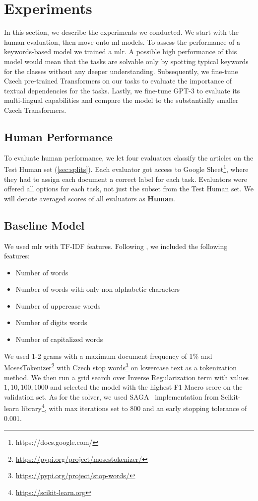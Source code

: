 \chapter{Experiments}
\label{chap:experiments}
In this section, we describe the experiments we conducted.
We start with the human evaluation, then move onto \ac{ml} models.
To assess the performance of a keywords-based model we trained 
a \ac{mlr}.  A possible high performance of
this model would mean that the tasks are solvable only by spotting typical keywords
for the classes without any deeper understanding. Subsequently,
we fine-tune Czech pre-trained Transformers on our tasks to evaluate
the importance of textual dependencies for the tasks. Lastly, we fine-tune
GPT-3 to evaluate its multi-lingual capabilities and compare the model to the
substantially smaller Czech Transformers.

\section{Human Performance}
\label{sec:human}
To evaluate human performance, we let four evaluators classify the articles on 
the Test Human set (\autoref{sec:splits}).
Each evaluator got access to Google Sheet\footnote{https://docs.google.com/},
where they had to assign each document a correct label for each task.
Evaluators were offered all options for each task, not just the subset from the Test Human set.
We will denote averaged scores of all evaluators as \textbf{Human}.

\section{Baseline Model}
\label{sec:baseline-exp}
We used \ac{mlr} with TF-IDF features.
Following \textcite{strakaSumeCzechLargeCzech2018a}, we included the following features:
\begin{itemize}
    \item Number of words
    \item Number of words with only non-alphabetic characters
    \item Number of uppercase words
    \item Number of digits words
    \item Number of capitalized words
\end{itemize}
We  used 1-2 grams with a maximum document frequency of 1\% and MosesTokenizer\footnote{\url{https://pypi.org/project/mosestokenizer/}}
with Czech stop words\footnote{\url{https://pypi.org/project/stop-words/}} on lowercase text as a tokenization method.
We then run a grid search over Inverse Regularization term with values $1, 10, 100, 1000$
and selected the model with the highest F1 Macro score on the validation set.
As for the solver, we used SAGA~\parencite{defazioSAGAFastIncremental2014}
implementation from Scikit-learn library\footnote{\url{https://scikit-learn.org}},
with max iterations set to 800 and an early stopping tolerance of 0.001.

